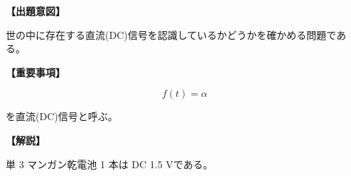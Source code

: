 \noindent \textbf{【出題意図】}

\noindent 世の中に存在する直流(DC)信号を認識しているかどうかを確かめる問題である。

\vspace{1em}
\noindent \textbf{【重要事項】}

\[
f(t) = \alpha
\]

\medskip
\noindent を直流(DC)信号と呼ぶ。


\vspace{1em}
\noindent \textbf{【解説】}

\noindent 単 3 マンガン乾電池 1 本は DC 1.5 Vである。
